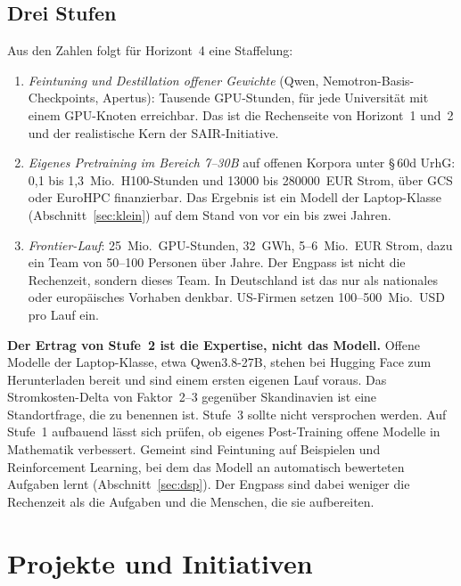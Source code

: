\documentclass[a4paper,11pt]{article}
\begin{document}
\subsection{Drei Stufen}

Aus den Zahlen folgt für Horizont~4 eine Staffelung:

\begin{enumerate}[itemsep=0.2em]
  \item \emph{Feintuning und Destillation offener Gewichte} (Qwen,
    Nemotron-Basis-Checkpoints, Apertus): Tausende GPU-Stunden, für
    jede Universität mit einem GPU-Knoten erreichbar. Das ist die
    Rechenseite von Horizont~1 und~2 und der realistische Kern der
    SAIR-Initiative.
  \item \emph{Eigenes Pretraining im Bereich 7--30B} auf offenen Korpora
    unter \S\,60d UrhG: 0,1 bis 1,3~Mio.\ H100-Stunden und
    \num{13000} bis \num{280000}~EUR Strom, über GCS oder EuroHPC
    finanzierbar. Das Ergebnis ist ein Modell der Laptop-Klasse
    (Abschnitt~\ref{sec:klein}) auf dem Stand von vor ein bis zwei
    Jahren.
  \item \emph{Frontier-Lauf}: 25~Mio.\ GPU-Stunden, 32~GWh, 5--6~Mio.\
    EUR Strom, dazu ein Team von 50--100 Personen über Jahre. Der
    Engpass ist nicht die Rechenzeit, sondern dieses Team. In
    Deutschland ist das nur als nationales oder europäisches Vorhaben
    denkbar.  US-Firmen setzen 100--500~Mio.\ USD pro Lauf ein.
\end{enumerate}

\textbf{Der Ertrag von Stufe~2 ist die Expertise, nicht das Modell.}
Offene Modelle der Laptop-Klasse, etwa Qwen3.8-27B, stehen bei Hugging
Face zum Herunterladen bereit und sind einem ersten eigenen Lauf
voraus. Das Stromkosten-Delta von Faktor~2--3
gegenüber Skandinavien ist eine Standortfrage, die zu benennen ist.
Stufe~3 sollte nicht versprochen werden. Auf Stufe~1 aufbauend lässt
sich prüfen, ob eigenes Post-Training offene Modelle in Mathematik
verbessert.  Gemeint sind Feintuning auf Beispielen und Reinforcement
Learning, bei dem das Modell an automatisch bewerteten Aufgaben lernt
(Abschnitt~\ref{sec:dsp}).  Der Engpass sind dabei weniger die
Rechenzeit als die Aufgaben und die Menschen, die sie aufbereiten.

\section{Projekte und Initiativen}
\label{sec:projekte}
\end{document}
